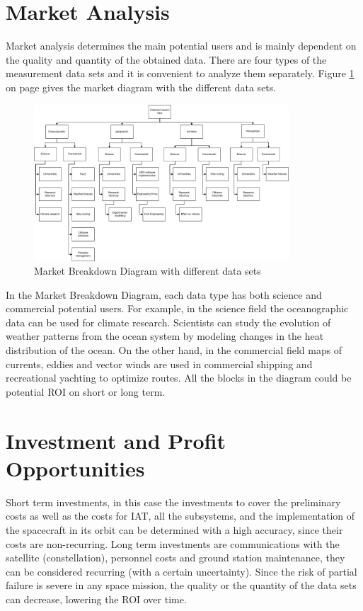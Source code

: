 \section{Market Analysis}
  \label{blMAanalysis}
Market analysis determines the main potential users and is mainly dependent on the quality and quantity of the obtained data. There are four types of the measurement data sets and it is convenient to analyze them separately. Figure \ref{MA} on page \pageref{MA} gives the market diagram with the different data sets.
\begin{figure} [ht]
	\begin{center}
 \includegraphics[width=0.85\textwidth,angle=0]{chapters/img/Market_analysis.jpg}	
	\caption{Market Breakdown Diagram with different data sets \cite{Market}}
	\label{MA}
	\end{center}
\end{figure}
In the Market Breakdown Diagram, each data type has both science and commercial potential users. For example, in the science field the oceanographic data can be used for climate research. Scientists can study the evolution of weather patterns from the ocean system by modeling changes in the heat distribution of the ocean. On the other hand, in the commercial field maps of currents, eddies and vector winds are used in commercial shipping and recreational yachting to optimize routes. All the blocks in the diagram could be potential \acs{ROI} on short or long term.

\section{Investment and Profit Opportunities}
	\label{blMAipo}
Short term investments, in this case the investments to cover the preliminary costs as well as the costs for \ac{IAT}, all the subsystems, and the implementation of the spacecraft in its orbit can be determined with a high accuracy, since their costs are non-recurring. Long term investments are communications with the satellite (constellation), personnel costs and ground station maintenance, they can be considered recurring (with a certain uncertainty). Since the risk of partial failure is severe in any space mission, the quality or the quantity of the data sets can decrease, lowering the \acs{ROI} over time. 

